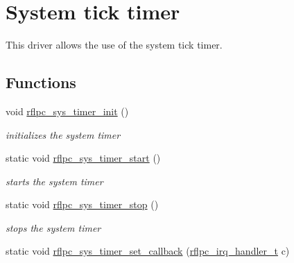 \hypertarget{group__systick}{\section{System tick timer}
\label{group__systick}
}


This driver allows the use of the system tick timer.  


\subsection*{Functions}
\begin{DoxyCompactItemize}
\item 
\hypertarget{group__systick_ga2b95025b2e40b1789a01041b572cc86b}{void \hyperlink{group__systick_ga2b95025b2e40b1789a01041b572cc86b}{rflpc\-\_\-sys\-\_\-timer\-\_\-init} ()}\label{group__systick_ga2b95025b2e40b1789a01041b572cc86b}

\begin{DoxyCompactList}\small\item\em initializes the system timer \end{DoxyCompactList}\item 
\hypertarget{group__systick_gabd54efc8c728f18ba5ea6f6e36fa0812}{static void \hyperlink{group__systick_gabd54efc8c728f18ba5ea6f6e36fa0812}{rflpc\-\_\-sys\-\_\-timer\-\_\-start} ()}\label{group__systick_gabd54efc8c728f18ba5ea6f6e36fa0812}

\begin{DoxyCompactList}\small\item\em starts the system timer \end{DoxyCompactList}\item 
\hypertarget{group__systick_gab008324e92a1ddd04eabcf8ba8ca90bd}{static void \hyperlink{group__systick_gab008324e92a1ddd04eabcf8ba8ca90bd}{rflpc\-\_\-sys\-\_\-timer\-\_\-stop} ()}\label{group__systick_gab008324e92a1ddd04eabcf8ba8ca90bd}

\begin{DoxyCompactList}\small\item\em stops the system timer \end{DoxyCompactList}\item 
\hypertarget{group__systick_ga54887d370bdff0a461127f5366f5f5ff}{static void \hyperlink{group__systick_ga54887d370bdff0a461127f5366f5f5ff}{rflpc\-\_\-sys\-\_\-timer\-\_\-set\-\_\-callback} (\hyperlink{group__irq_ga4970a8a2cf9b63e4c261982504669a1f}{rflpc\-\_\-irq\-\_\-handler\-\_\-t} c)}\label{group__systick_ga54887d370bdff0a461127f5366f5f5ff}


\end{DoxyCompactItemize}
